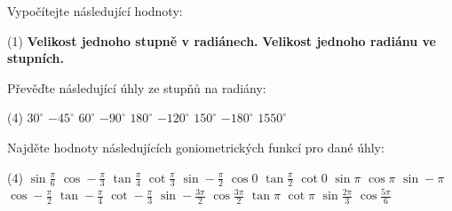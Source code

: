 \documentclass[12pt,a4paper]{article}
\begin{document}
\begin{exercise}
Vypočítejte následující hodnoty:

\begin{tasks}(1)
    \task \textbf{Velikost jednoho stupně v radiánech.}
    \task \textbf{Velikost jednoho radiánu ve stupních.}
\end{tasks}

\end{exercise}


\begin{exercise}
    Převěďte následující úhly ze stupňů na radiány:
    \begin{tasks}(4)
        \task $30^\circ $
        \task $-45^\circ $
        \task $60^\circ $
        \task $-90^\circ $
        \task $180^\circ $
        \task $-120^\circ $ 
        \task $150^\circ $
        \task $-180^\circ $
        \task $1550^\circ $
        
    \end{tasks}
\end{exercise}


\begin{exercise}
    Najděte hodnoty následujících goniometrických funkcí pro dané úhly:
    \begin{tasks}(4)
        \task $\sin \frac{\pi}{6} $
        \task $\cos -\frac{\pi}{3} $
        \task $\tan \frac{\pi}{4} $
        \task $\cot \frac{\pi}{3} $
        \task $\sin -\frac{\pi}{2} $
        \task $\cos 0 $ 
        \task $\tan \frac{\pi}{2} $
        \task $\cot 0 $
        \task $\sin \pi $
        \task $\cos \pi $
        \task $\sin -\pi $
        \task $\cos -\frac{\pi}{2} $
        \task $\tan -\frac{\pi}{4} $
        \task $\cot -\frac{\pi}{3} $
        \task $\sin -\frac{3\pi}{2} $
        \task $\cos \frac{3\pi}{2} $
        \task $\tan \pi $
        \task $\cot \pi $
        \task $\sin \frac{2\pi}{3} $
        \task $\cos \frac{5\pi}{6} $
    \end{tasks}
\end{exercise}
\end{document}
